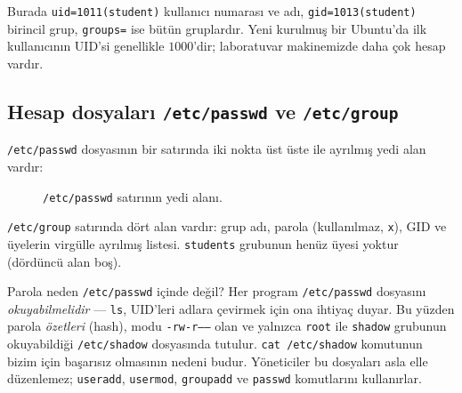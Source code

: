 \documentclass[11pt,a4paper]{article}
\newcommand{\cmd}[1]{\texttt{#1}}
\begin{document}


Burada \texttt{uid=1011(student)} kullanıcı numarası ve adı, \texttt{gid=1013(student)} birincil grup, \texttt{groups=} ise bütün gruplardır. Yeni kurulmuş bir Ubuntu'da ilk kullanıcının UID'si genellikle $1000$'dir; laboratuvar makinemizde daha çok hesap vardır.

\subsection{Hesap dosyaları \texttt{/etc/passwd} ve \texttt{/etc/group}}



\texttt{/etc/passwd} dosyasının bir satırında iki nokta üst üste ile ayrılmış yedi alan vardır:

\begin{figure}[H]
\centering
{}
\caption{\texttt{/etc/passwd} satırının yedi alanı.}
\end{figure}

\texttt{/etc/group} satırında dört alan vardır: grup adı, parola (kullanılmaz, \texttt{x}), GID ve üyelerin virgülle ayrılmış listesi. \texttt{students} grubunun henüz üyesi yoktur (dördüncü alan boş).

Parola neden \texttt{/etc/passwd} içinde değil? Her program \texttt{/etc/passwd} dosyasını \emph{okuyabilmelidir} --- \cmd{ls}, UID'leri adlara çevirmek için ona ihtiyaç duyar. Bu yüzden parola \emph{özetleri} (hash), modu \texttt{-rw-r-----} olan ve yalnızca \texttt{root} ile \texttt{shadow} grubunun okuyabildiği \texttt{/etc/shadow} dosyasında tutulur. \cmd{cat /etc/shadow} komutunun bizim için başarısız olmasının nedeni budur. Yöneticiler bu dosyaları asla elle düzenlemez; \cmd{useradd}, \cmd{usermod}, \cmd{groupadd} ve \cmd{passwd} komutlarını kullanırlar.
\end{document}
